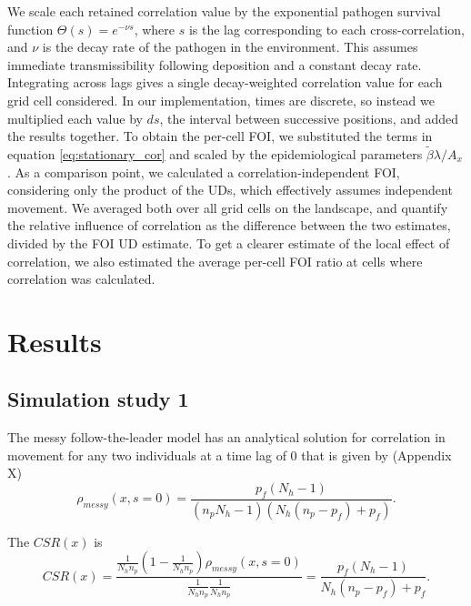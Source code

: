 \documentclass[letterpaper]{article}
\begin{document}
We scale each retained correlation value by the exponential pathogen survival function $\Theta(s) = e^{-\nu s}$, where $s$ is the lag corresponding to each cross-correlation, and $\nu$ is the decay rate of the pathogen in the environment. This assumes immediate transmissibility following deposition and a constant decay rate. Integrating across lags gives a single decay-weighted correlation value for each grid cell considered. In our implementation, times are discrete, so instead we multiplied each value by $ds$, the interval between successive positions, and added the results together. To obtain the per-cell FOI, we substituted the terms in equation \ref{eq:stationary_cor} and scaled by the epidemiological parameters $\tilde\beta\lambda/ A_x$. As a comparison point, we calculated a correlation-independent FOI, considering only the product of the UDs, which effectively assumes independent movement. We averaged both over all grid cells on the landscape, and quantify the relative influence of correlation as the difference between the two estimates, divided by the FOI UD estimate. To get a clearer estimate of the local effect of correlation, we also estimated the average per-cell FOI ratio at cells where correlation was calculated. %

\section*{Results}

\subsection*{Simulation study 1}

The messy follow-the-leader model has an analytical solution for correlation in movement for any two individuals at a time lag of 0 that is given by (Appendix X)
\begin{equation}
    \rho_{messy}(x, s=0) = \frac{p_f(N_h - 1)}{(n_p N_h - 1)(N_h(n_p - p_f) + p_f)}.
    \label{eq:messy_leader}
\end{equation}

The $CSR(x)$ is
\begin{equation}
    CSR(x) = \frac{\frac{1}{N_h n_p}(1 - \frac{1}{N_h n_p})\rho_{messy}(x, s=0)}{\frac{1}{N_h n_p} \frac{1}{N_h n_p}} = \frac{p_f(N_h - 1)}{N_h(n_p - p_f) + p_f}.
    \label{eq:relative_contrib}
\end{equation}
\end{document}
